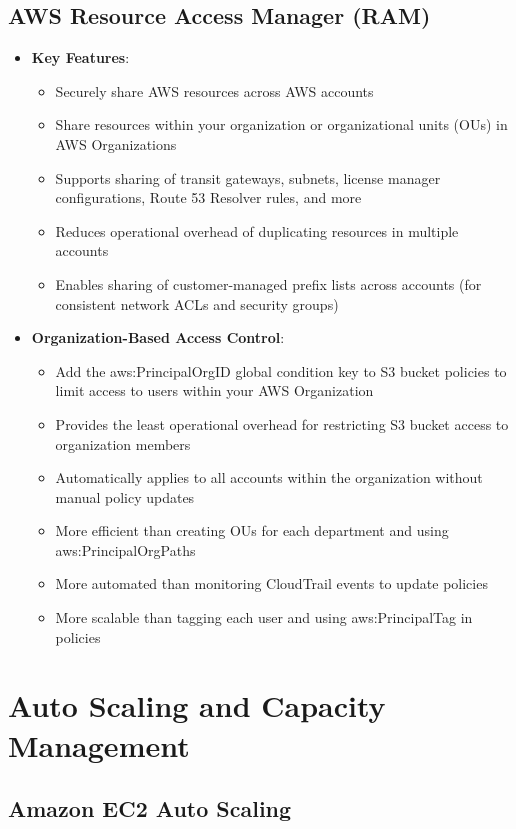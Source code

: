 \documentclass[11pt,a4paper]{report}
\begin{document}
\section{AWS Resource Access Manager (RAM)}

\begin{itemize}
  \item \textbf{Key Features}:
\begin{itemize}
  \item Securely share AWS resources across AWS accounts
  \item Share resources within your organization or organizational units (OUs) in AWS Organizations
  \item Supports sharing of transit gateways, subnets, license manager configurations, Route 53 Resolver rules, and more
  \item Reduces operational overhead of duplicating resources in multiple accounts
  \item Enables sharing of customer-managed prefix lists across accounts (for consistent network ACLs and security groups)
\end{itemize}
  \item \textbf{Organization-Based Access Control}:
\begin{itemize}
  \item Add the aws:PrincipalOrgID global condition key to S3 bucket policies to limit access to users within your AWS Organization
  \item Provides the least operational overhead for restricting S3 bucket access to organization members
  \item Automatically applies to all accounts within the organization without manual policy updates
  \item More efficient than creating OUs for each department and using aws:PrincipalOrgPaths
  \item More automated than monitoring CloudTrail events to update policies
  \item More scalable than tagging each user and using aws:PrincipalTag in policies
\end{itemize}
\end{itemize}


\chapter{Auto Scaling and Capacity Management}



\section{Amazon EC2 Auto Scaling}
\end{document}

